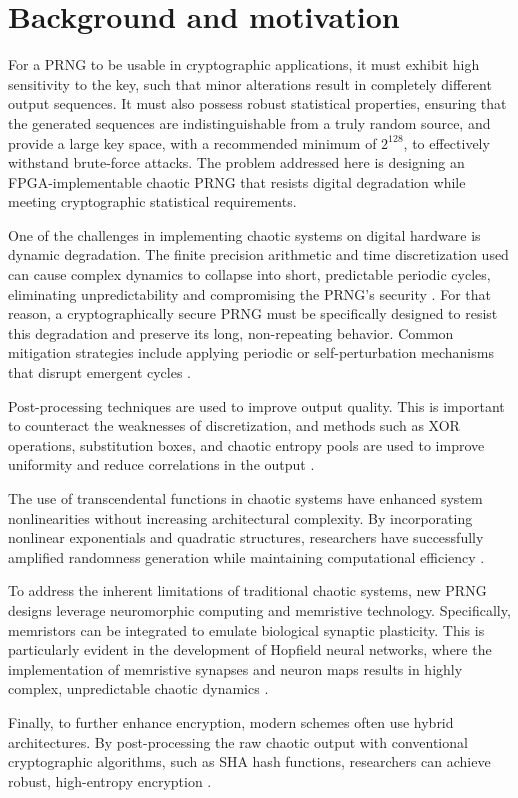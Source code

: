 \documentclass[preprint, 12pt, sort&compress]{elsarticle}
\begin{document}
\section{Background and motivation}\label{sec_2}
For a PRNG to be usable in cryptographic applications, it must exhibit high sensitivity to the key, such that minor alterations result in completely different output sequences. It must also possess robust statistical properties, ensuring that the generated sequences are indistinguishable from a truly random source, and provide a large key space, with a recommended minimum of $2^{128}$, to effectively withstand brute-force attacks. The problem addressed here is designing an FPGA-implementable chaotic PRNG that resists digital degradation while meeting cryptographic statistical requirements.

One of the challenges in implementing chaotic systems on digital hardware is dynamic degradation. The finite precision arithmetic and time discretization used can cause complex dynamics to collapse into short, predictable periodic cycles, eliminating unpredictability and compromising the PRNG's security \cite{senouci_fpga_2017, hobincu_fpga_2018}. For that reason, a cryptographically secure PRNG must be specifically designed to resist this degradation and preserve its long, non-repeating behavior. Common mitigation strategies include applying periodic or self-perturbation mechanisms that disrupt emergent cycles \cite{hocine_prng_2023}. 

Post-processing techniques are used to improve output quality. This is important to counteract the weaknesses of discretization, and methods such as XOR operations, substitution boxes, and chaotic entropy pools are used to improve uniformity and reduce correlations in the output \cite{li_dynamic_2019, garipcan_trng_2020}.

{\color{red}
The use of transcendental functions in chaotic systems have enhanced system nonlinearities without increasing architectural complexity. By incorporating nonlinear exponentials and quadratic structures, researchers have successfully amplified randomness generation while maintaining computational efficiency \cite{shi_lossless_2026,feng_exploiting_2024}.

To address the inherent limitations of traditional chaotic systems, new PRNG designs leverage neuromorphic computing and memristive technology. Specifically, memristors can be integrated to emulate biological synaptic plasticity. This is particularly evident in the development of Hopfield neural networks, where the implementation of memristive synapses and neuron maps results in highly complex, unpredictable chaotic dynamics \cite{lai_unified_2025,lai_encryption_2025,he_multi_2025,yu_extreme_2026,yu_novel_2026}.

Finally, to further enhance encryption, modern schemes often use hybrid architectures. By post-processing the raw chaotic output with conventional cryptographic algorithms, such as SHA hash functions, researchers can achieve robust, high-entropy encryption \cite{meranza_novel_2026,lai_family_2025}.
}
\end{document}
